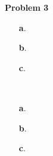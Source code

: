 \textbf{Problem 3}

\begin{itemize}
 \item[\textbf{a}.]
 \item[\textbf{b}.] 
 \item[\textbf{c}.]
 \end{itemize}
\begin{solution}\

\begin{itemize}
 \item[\textbf{a}.]
 \item[\textbf{b}.] 
 \item[\textbf{c}.]
 \end{itemize}

\end{solution}

